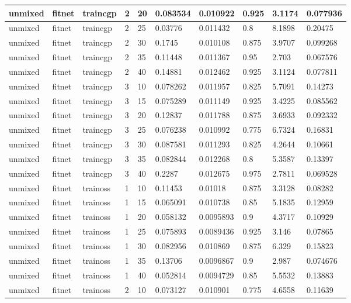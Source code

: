 \begin{longtable}{lllllllll}
unmixed & fitnet & traincgp & 2 & 20 & 0.083534 & 0.010922 & 0.925 & 3.1174 & 0.077936 \\ \hline 
unmixed & fitnet & traincgp & 2 & 25 & 0.03776 & 0.011432 & 0.8 & 8.1898 & 0.20475 \\ \hline 
unmixed & fitnet & traincgp & 2 & 30 & 0.1745 & 0.010108 & 0.875 & 3.9707 & 0.099268 \\ \hline 
unmixed & fitnet & traincgp & 2 & 35 & 0.11448 & 0.011367 & 0.95 & 2.703 & 0.067576 \\ \hline 
unmixed & fitnet & traincgp & 2 & 40 & 0.14881 & 0.012462 & 0.925 & 3.1124 & 0.077811 \\ \hline 
unmixed & fitnet & traincgp & 3 & 10 & 0.078262 & 0.011957 & 0.825 & 5.7091 & 0.14273 \\ \hline 
unmixed & fitnet & traincgp & 3 & 15 & 0.075289 & 0.011149 & 0.925 & 3.4225 & 0.085562 \\ \hline 
unmixed & fitnet & traincgp & 3 & 20 & 0.12837 & 0.011788 & 0.875 & 3.6933 & 0.092332 \\ \hline 
unmixed & fitnet & traincgp & 3 & 25 & 0.076238 & 0.010992 & 0.775 & 6.7324 & 0.16831 \\ \hline 
unmixed & fitnet & traincgp & 3 & 30 & 0.087581 & 0.011293 & 0.825 & 4.2644 & 0.10661 \\ \hline 
unmixed & fitnet & traincgp & 3 & 35 & 0.082844 & 0.012268 & 0.8 & 5.3587 & 0.13397 \\ \hline 
unmixed & fitnet & traincgp & 3 & 40 & 0.2287 & 0.012675 & 0.975 & 2.7811 & 0.069528 \\ \hline 
unmixed & fitnet & trainoss & 1 & 10 & 0.11453 & 0.01018 & 0.875 & 3.3128 & 0.08282 \\ \hline 
unmixed & fitnet & trainoss & 1 & 15 & 0.065091 & 0.010738 & 0.85 & 5.1835 & 0.12959 \\ \hline 
unmixed & fitnet & trainoss & 1 & 20 & 0.058132 & 0.0095893 & 0.9 & 4.3717 & 0.10929 \\ \hline 
unmixed & fitnet & trainoss & 1 & 25 & 0.075893 & 0.0089436 & 0.925 & 3.146 & 0.07865 \\ \hline 
unmixed & fitnet & trainoss & 1 & 30 & 0.082956 & 0.010869 & 0.875 & 6.329 & 0.15823 \\ \hline 
unmixed & fitnet & trainoss & 1 & 35 & 0.13706 & 0.0096867 & 0.9 & 2.987 & 0.074676 \\ \hline 
unmixed & fitnet & trainoss & 1 & 40 & 0.052814 & 0.0094729 & 0.85 & 5.5532 & 0.13883 \\ \hline 
unmixed & fitnet & trainoss & 2 & 10 & 0.073127 & 0.010901 & 0.775 & 4.6558 & 0.11639 \\ \hline 

\end{longtable}
